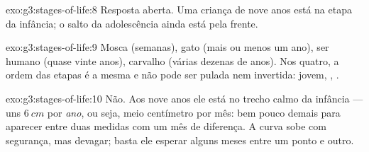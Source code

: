 \begin{solution}{exo:g3:stages-of-life:8}
Resposta aberta. Uma criança de nove anos está na etapa da infância;
o salto da adolescência ainda está pela frente.
\end{solution}

\begin{solution}{exo:g3:stages-of-life:9}
Mosca (semanas), gato (mais ou menos um ano), ser humano (quase
vinte anos), carvalho (várias dezenas de anos). Nos quatro, a ordem
das etapas é a mesma e não pode ser pulada nem invertida: jovem,
, .
\end{solution}

\begin{solution}{exo:g3:stages-of-life:10}
Não. Aos nove anos ele está no trecho calmo da infância --- uns
$\qty{6}{cm}$ por \emph{ano}, ou seja, meio centímetro por mês: bem
pouco demais para aparecer entre duas medidas com um mês de
diferença. A curva sobe com segurança, mas devagar; basta ele
esperar alguns meses entre um ponto e outro.
\end{solution}
